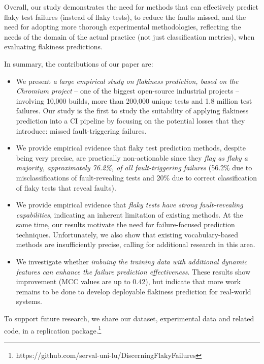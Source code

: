 Overall, our study demonstrates the need for methods that can effectively predict flaky test failures (instead of flaky tests), to reduce the faults missed, and the need for adopting more thorough experimental methodologies, reflecting the needs of the domain of the actual practice (not just classification metrics), when evaluating flakiness predictions. 

In summary, the contributions of our paper are:
\begin{itemize}
    \item We present \textit{a large empirical study on flakiness prediction, based on the Chromium project} -- one of the biggest open-source industrial projects -- involving 10,000 builds, more than 200,000 unique tests and 1.8 million test failures. Our study is the first to study the suitability of applying flakiness prediction into a CI pipeline by focusing on the potential losses that they introduce: missed fault-triggering failures.  
    
    \item We provide empirical evidence that flaky test prediction methods, despite being very precise, are practically non-actionable since they \textit{flag as flaky a majority, approximately 76.2\%, of all fault-triggering failures} (56.2\% due to misclassifications of fault-revealing tests and 20\% due to correct classification of flaky tests that reveal faults).

    \item We provide empirical evidence that \textit{flaky tests have strong fault-revealing capabilities}, indicating an inherent limitation of existing methods. At the same time, our results motivate the need for failure-focused prediction techniques. Unfortunately, we also show that existing vocabulary-based methods are insufficiently precise, calling for additional research in this area.  

    \item We investigate whether \textit{imbuing the training data with additional dynamic features can enhance the failure prediction effectiveness}. These results show  improvement (MCC values are up to 0.42), but indicate that more work remains to be done to develop deployable flakiness prediction for real-world systems.
   
\end{itemize}

To support future research, we share our dataset, experimental data and related code, in a replication package.\footnote{https://github.com/serval-uni-lu/DiscerningFlakyFailures}